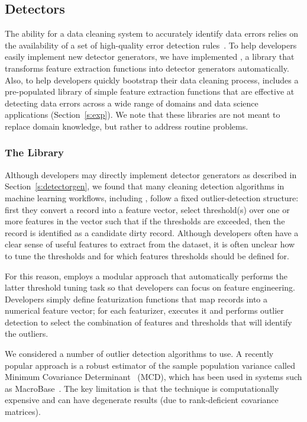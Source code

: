 \subsection{Detectors}
The ability for a data cleaning system to accurately identify data errors relies on the availability of a set of high-quality error detection rules~\cite{DBLP:conf/sigmod/ChuIKW16}.  To help developers easily implement new detector generators, we have implemented \detectlib, a library that transforms feature extraction functions into detector generators automatically.  Also, to help developers quickly bootstrap their data cleaning process, \sys includes a pre-populated library of simple feature extraction functions that are effective at detecting data errors across a wide range of domains and data science applications (Section~\ref{s:exp}).  We note that these libraries are not meant to replace domain knowledge, but rather to address routine problems.

\subsubsection{The \detectlib Library}
Although developers may directly implement detector generators as described in Section~\ref{s:detectorgen}, we found that many cleaning detection algorithms in machine learning workflows, including \company, follow a fixed outlier-detection structure: first they convert a record into a feature vector,  select threshold(s) over one or more features in the vector such that if the thresholds are exceeded, then the record is identified as a candidate dirty record.  Although developers often have a clear sense of useful features to extract from the dataset, it is often unclear how to tune the thresholds and for which features thresholds should be defined for.  

For this reason, \detectlib employs a modular approach that automatically performs the latter threshold tuning task so that developers can focus on feature engineering.   Developers simply define featurization functions that map records into a numerical feature vector; for each featurizer, \detectlib executes it and performs outlier detection to select the combination of features and thresholds that will identify the outliers.  

We considered a number of outlier detection algorithms to use.  A recently popular approach is a robust estimator of the sample population variance called Minimum Covariance Determinant~\cite{rousseeuw2011robust} (MCD), which has been used in systems such as MacroBase~\cite{bailis2016macrobase}.  The key limitation is that the technique is computationally expensive and can have degenerate results (due to rank-deficient covariance matrices).

